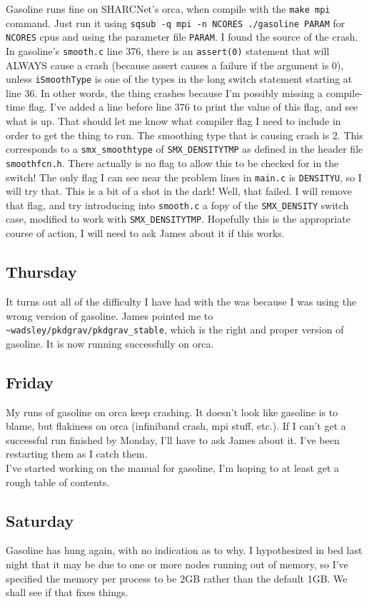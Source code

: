 \documentclass[11pt,letterpaper]{article}
\begin{document}
Gasoline runs fine on SHARCNet's orca, when compile with the \verb!make mpi!
command.  Just run it using \verb!sqsub -q mpi -n NCORES ./gasoline PARAM! for
\verb!NCORES! cpus and using the parameter file \verb!PARAM!.
I found the source of the crash.  In gasoline's \verb!smooth.c! line 376, there
is an \verb!assert(0)! statement that will ALWAYS cause a crash (because assert
causes a failure if the argument is 0), unless \verb!iSmoothType! is one of the 
types in the long switch statement starting at line 36.  In other words, the 
thing crashes because I'm possibly missing a compile-time flag.  I've added
a line before line 376 to print the value of this flag, and see what is up.
That should let me know what compiler flag I need to include in order to get
the thing to run. The smoothing type that is causing crash is 2.  This 
corresponds to a \verb!smx_smoothtype! of \verb!SMX_DENSITYTMP! as defined in 
the header file \verb!smoothfcn.h!.  There actually is no flag to allow this
to be checked for in the switch!  The only flag I can see near the problem 
lines in \verb!main.c! is \verb!DENSITYU!, so I will try that.  This is a bit
of a shot in the dark!  Well, that failed.  I will remove that flag, and try
introducing into \verb!smooth.c! a fopy of the \verb!SMX_DENSITY! switch case,
modified to work with \verb!SMX_DENSITYTMP!.  Hopefully this is the appropriate
course of action, I will need to ask James about it if this works.
\subsection*{Thursday}
It turns out all of the difficulty I have had with the was because I was using
the wrong version of gasoline.  James pointed me to 
\verb!~wadsley/pkdgrav/pkdgrav_stable!, which is the right and proper version
of gasoline.  It is now running successfully on orca.
\subsection*{Friday}
My runs of gasoline on orca keep crashing.  It doesn't look like gasoline is to
blame, but flakiness on orca (infiniband crash, mpi stuff, etc.).  If I can't 
get a successful run finished by Monday, I'll have to ask James about it.  I've
been restarting them as I catch them.\\

I've started working on the manual for gasoline, I'm hoping to at least get a 
rough table of contents.
\subsection*{Saturday}
Gasoline has hung again, with no indication as to why.  I hypothesized in bed 
last night that it may be due to one or more nodes running out of memory, so
I've specified the memory per process to be 2GB rather than the default 1GB.
We shall see if that fixes things.
\end{document}
